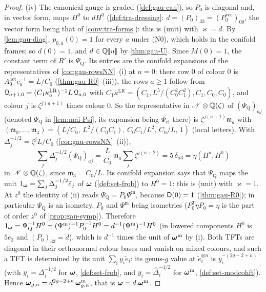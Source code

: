 \begin{proof}
(iv) The canonical gauge is graded (\cref{def:gau-can}), so $P_0$ is diagonal and, in vector form, maps $H^0$ to $dH^0$ (\cref{def:tra-dressing}: $d=(P_0)_{33}=(P_0^{\mathrm{vec}})_{00}$, the vector form being that of \cref{conv:tra-forms}): this is (unit) with $\varkappa=d$. By \cref{lem:gau-diag}, $p_{0,a}(0)=1$ for every $a$ under (N0), which holds in the conifold frames; so $d(0)=1$, and $d\in\mathbb{Q}[\![ u ]\!]$ by \cref{thm:gau-U}. Since $M(0)=1$, the constant term of $R'$ is $\Psi_{\mathrm Q}$. Its entries are the conifold expansions of the representatives of \cref{cor:gau-rowsNN}~(i) at $n=0$: there row $0$ of colour $0$ is $A^{\mathrm{act}}_0c_0^{-1}=L/C_0$ (\cref{thm:gau-R0}~(iii)), the rows $a\geq1$ follow from $\mathcal{Q}_{a+1,0}=(C_1\kappa^{\mathrm{LR}}_a)^{-1}L\,\mathcal{Q}_{a,0}$ with $C_1\kappa^{\mathrm{LR}}=(C_1,L^5/(C_0^2C_1^2),C_1,C_0,C_0)$, and colour $j$ is $\zeta^{j(a+1)}$ times colour $0$. So the representative in $\mathscr{N}\otimes\mathbb{Q}(\zeta)$ of $(\Psi_{\mathrm Q})_{aj}$ (denoted $\Psi_{\mathrm Q}$ in \cref{lem:mai-Psi}, its expansion being $\Psi_{\mathrm{cf}}$ there) is $\zeta^{j(a+1)}\mathfrak m_a$ with $(\mathfrak m_0,\dots,\mathfrak m_4)=(L/C_0,\,L^2/(C_0C_1),\,C_0C_1/L^2,\,C_0/L,\,1)$ (local letters). With $\Delta_j^{-1/2}=\zeta^jL/C_0$ (\cref{cor:gau-rowsNN}~(ii)),
\[
\textstyle\sum_j\Delta_j^{-1/2}(\Psi_{\mathrm Q})_{aj}=\frac L{C_0}\,\mathfrak m_a\sum_j\zeta^{j(a+2)}=5\,\delta_{a3}=\eta(H^a,H^0)
\]
in $\mathscr{N}\otimes\mathbb{Q}(\zeta)$, since $\mathfrak m_3=C_0/L$. Its conifold expansion says that $\Psi_{\mathrm Q}$ maps the unit $1_{\boldsymbol{\omega}}=\sum_j\Delta_j^{-1/2}\tilde e_j$ of $\boldsymbol{\omega}$ (\cref{def:set-frob}) to $H^0=1$: this is (unit) with $\varkappa=1$. At $z^0$ the identity of (ii) reads $\Psi_{\mathrm Q}=P_0\Psi^{\mathrm m}$, because $\mathsf{D}(0)=1$ (\cref{thm:gau-R0}); in particular $\Psi_{\mathrm Q}$ is an isometry, $P_0$ and $\Psi^{\mathrm m}$ being isometries ($P_0^T\eta P_0=\eta$ is the part of order $z^0$ of \cref{prop:gau-symp}). Therefore $1_{\boldsymbol{\omega}}=\Psi_{\mathrm Q}^{-1}H^0=(\Psi^{\mathrm m})^{-1}P_0^{-1}H^0=d^{-1}(\Psi^{\mathrm m})^{-1}H^0$ (in lowered components $H^0$ is $5e_3$ and $(P_0)_{33}=d$), which is $d^{-1}$ times the unit of $\boldsymbol{\omega}^{\mathrm m}$ by (i). Both TFTs are diagonal in their orthonormal colour bases and vanish on mixed colours, and such a TFT is determined by its unit $\sum_iy_i\tilde e_i$: its genus-$g$ value at $\tilde e_i^{\otimes n}$ is $y_i^{-(2g-2+n)}$ (with $y_i=\Delta_i^{-1/2}$ for $\boldsymbol{\omega}$, \cref{def:set-frob}, and $y_i=\hat\Delta_i^{-1/2}$ for $\boldsymbol{\omega}^{\mathrm m}$, \cref{def:set-modcohft}). Hence $\boldsymbol{\omega}_{g,n}=d^{2g-2+n}\,\boldsymbol{\omega}^{\mathrm m}_{g,n}$, that is $\boldsymbol{\omega}=d.\boldsymbol{\omega}^{\mathrm m}$.
\end{proof}

